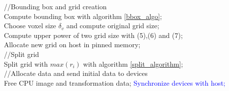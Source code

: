 \documentclass[12pt,journal,compsoc]{IEEEtran}
\begin{document}
\begin{algorithm}

\textcolor{OliveGreen}{//Bounding box and grid creation}\\
Compute bounding box with algorithm \ref{bbox_algo};\\
Choose voxel size $\delta_v$ and compute original grid size;\\
Compute upper power of two grid size with (5),(6) and (7);\\
Allocate new grid on host in pinned memory;\\

\textcolor{OliveGreen}{//Split grid}\\
Split grid with $max(r_i)$ with algorithm \ref{split_algorithm};\\

\textcolor{OliveGreen}{//Allocate data and send initial data to devices}\\
Free CPU image and transformation data;
\textcolor{Blue}{Synchronize devices with host;}
\end{algorithm}
\end{document}
